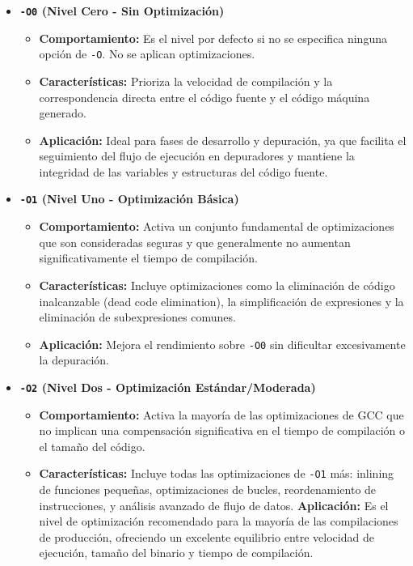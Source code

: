 \documentclass{article}
\begin{document}
	\begin{itemize}[leftmargin=*,noitemsep,topsep=0pt]
		\item \textbf{\texttt{-O0} (Nivel Cero - Sin Optimización)}
		\begin{itemize}[leftmargin=*,noitemsep,topsep=0pt]
			\item \textbf{Comportamiento:} Es el nivel por defecto si no se especifica ninguna opción de \texttt{-O}. No se aplican optimizaciones.
			\item \textbf{Características:} Prioriza la velocidad de compilación y la correspondencia directa entre el código fuente y el código máquina generado.
			\item \textbf{Aplicación:} Ideal para fases de desarrollo y depuración, ya que facilita el seguimiento del flujo de ejecución en depuradores y mantiene la integridad de las variables y estructuras del código fuente.
		\end{itemize}
		
		\item \textbf{\texttt{-O1} (Nivel Uno - Optimización Básica)}
		\begin{itemize}[leftmargin=*,noitemsep,topsep=0pt]
			\item \textbf{Comportamiento:} Activa un conjunto fundamental de optimizaciones que son consideradas seguras y que generalmente no aumentan significativamente el tiempo de compilación.
			\item \textbf{Características:} Incluye optimizaciones como la eliminación de código inalcanzable (dead code elimination), la simplificación de expresiones y la eliminación de subexpresiones comunes.
			\item \textbf{Aplicación:} Mejora el rendimiento sobre \texttt{-O0} sin dificultar excesivamente la depuración.
		\end{itemize}
		
		\item \textbf{\texttt{-O2} (Nivel Dos - Optimización Estándar/Moderada)}
		\begin{itemize}[leftmargin=*,noitemsep,topsep=0pt]
			\item \textbf{Comportamiento:} Activa la mayoría de las optimizaciones de GCC que no implican una compensación significativa en el tiempo de compilación o el tamaño del código.
			\item \textbf{Características:} Incluye todas las optimizaciones de \texttt{-O1} más: inlining de funciones pequeñas, optimizaciones de bucles, reordenamiento de instrucciones, y análisis avanzado de flujo de datos.
			\textbf{Aplicación:} Es el nivel de optimización recomendado para la mayoría de las compilaciones de producción, ofreciendo un excelente equilibrio entre velocidad de ejecución, tamaño del binario y tiempo de compilación.
		\end{itemize}
		

\end{itemize}
\end{document}
